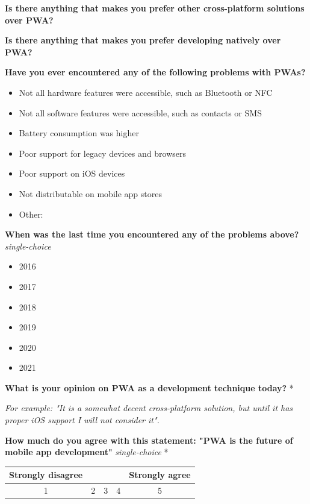 \documentclass[a4paper,12pt]{article}
\begin{document}
\textbf{Is there anything that makes you prefer other cross-platform solutions over PWA?}

\quad

\textbf{Is there anything that makes you prefer developing natively over PWA?}

\quad

\textbf{Have you ever encountered any of the following problems with PWAs?}
\begin{itemize}
    \item Not all hardware features were accessible, such as Bluetooth or NFC
    \item Not all software features were accessible, such as contacts or SMS
    \item Battery consumption was higher
    \item Poor support for legacy devices and browsers
    \item Poor support on iOS devices
    \item Not distributable on mobile app stores
    \item Other:
\end{itemize}

\textbf{When was the last time you encountered any of the problems above?} \textit{single-choice}
\begin{itemize}
    \item 2016
    \item 2017
    \item 2018
    \item 2019
    \item 2020
    \item 2021
\end{itemize}

\textbf{What is your opinion on PWA as a development technique today?} *

\textit{For example: "It is a somewhat decent cross-platform solution, but until it has proper iOS support I will not consider it".}

\quad

\textbf{How much do you agree with this statement: "PWA is the future of mobile app development"} \textit{single-choice}  *

\begin{tabular}{ccccc}
    Strongly disagree & & & & Strongly agree \\
    \hline
    \multicolumn{1}{|c|}{1} & \multicolumn{1}{c|}{2} & \multicolumn{1}{c|}{3} & \multicolumn{1}{c|}{4} & \multicolumn{1}{c|}{5} \\
     \hline
\end{tabular}
\end{document}
